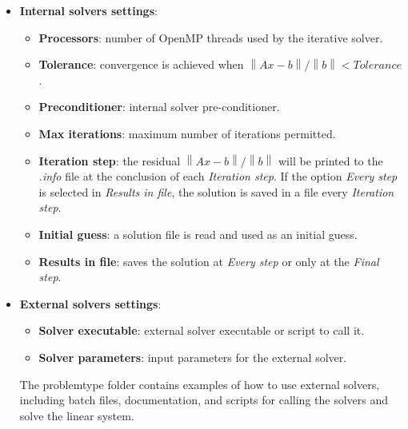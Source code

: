 \begin{itemize}
    After the matrix and vector are saved, the external solver will be called using the parameters specified in \emph{External solvers settings}. Once the external solver completes its execution, ERMES 20.0 will be called again to read the solution and generate result files suitable for visualization. If the textboxes in \emph{External solvers settings} are left blank, ERMES 20.0 will end immediately after saving the linear system. The saved system can then be read and solved at a later time. 
	\item \textbf{Internal solvers settings}: 
	\begin{itemize}\itemsep0.5em 
		\item \textbf{Processors}: number of OpenMP threads used by the iterative solver.
		\item \textbf{Tolerance}: convergence is achieved when $\left\| Ax - b \right\| / \left\| b \right\| < Tolerance$.
		\item \textbf{Preconditioner}: internal solver pre-conditioner.
		\item \textbf{Max iterations}: maximum number of iterations permitted.
		\item \textbf{Iteration step}: the residual $\left\| Ax - b \right\| / \left\| b \right\|$ will be printed to the \textit{.info} file at the conclusion of each \emph{Iteration step}. If the option \textit{Every step} is selected in \emph{Results in file}, the solution is saved in a file every \emph{Iteration step}.
		\item \textbf{Initial guess}: a solution file is read and used as an initial guess.
		\item \textbf{Results in file}: saves the solution at \textit{Every step} or only at the \textit{Final step}.
	\end{itemize}
	\item \textbf{External solvers settings}: 
	\begin{itemize}\itemsep0.25em 
		\item \textbf{Solver executable}: external solver executable or script to call it. 
		\item \textbf{Solver parameters}: input parameters for the external solver.
	\end{itemize}
	The problemtype folder  contains examples of how to use external solvers, including batch files, documentation, and scripts for calling the solvers and solve the linear system.
\end{itemize}

\vspace{1cm}

